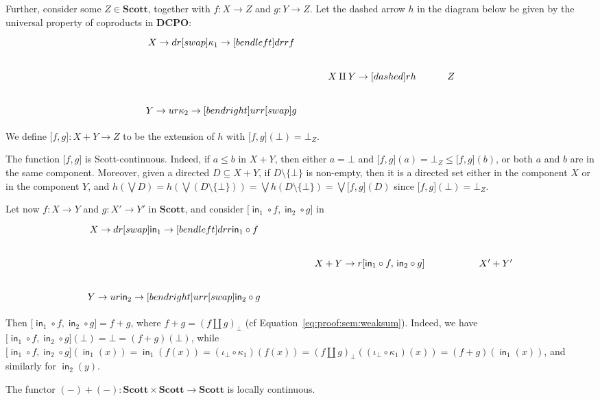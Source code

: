 \documentclass[%
  a4paper,
  UKenglish,
  cleveref,
  autoref,
  thm-restate,
  numberwithinsect,
]{lipics-v2021}
\newcommand\sle\subseteq
\newcommand\pl{\mathord{-}}	%
\newcommand\copair[1]{{\lbrack #1 \rbrack}}
\newcommand\comp{\mathbin\circ}
\newcommand\DCPO{\mathbf{DCPO}}
\newcommand\Scott{\mathbf{Scott}}
\newcommand\term[1]{\mathsf{#1}}
\newcommand\inj{\mathop{\term{in}}}
\newcommand\arrow\to
\begin{document}
Further,
consider some $Z \in \Scott$,
together with $f \colon X \to Z$
and $g \colon Y \to Z$.
Let the dashed arrow $h$ in the diagram below be given by the
universal property of coproducts in $\DCPO$:
\[
\begin{tikzcd}
  X
  \arrow{dr}[swap]{\kappa_1}
  \arrow[bend left]{drr}{f}
\\
& X \amalg Y
  \arrow[dashed]{r}{h}
& Z
\\
  Y
  \arrow{ur}{\kappa_2}
  \arrow[bend right]{urr}[swap]{g}
\end{tikzcd}
\]

\noindent
We define $\copair{f,g} \colon X+Y \to Z$
to be the extension of $h$ with $\copair{f,g}(\bot) = \bot_Z$.

The function $\copair{f,g}$ is Scott-continuous.
Indeed, if $a \leq b$ in $X+Y$,
then either $a = \bot$
and $\copair{f,g}(a) = \bot_Z \leq \copair{f,g}(b)$,
or both $a$ and $b$ are in the same component.
Moreover, given a directed $D \sle X + Y$,
if $D \setminus \{\bot\}$ is non-empty,
then it is a directed set either in the component $X$ or in the component $Y$,
and
\(
  h(\bigvee D)
  =
  h(\bigvee (D\setminus \{\bot\}))
  =
  \bigvee h(D \setminus \{\bot\})
  =
  \bigvee \copair{f,g}(D)
\)
since $\copair{f,g}(\bot) = \bot_Z$.

Let now $f \colon X \to Y$
and $g \colon X' \to Y'$ in $\Scott$,
and consider 
$\copair{{\inj_1} \comp f, {\inj_2} \comp g}$
in
\[
\begin{tikzcd}[column sep=huge]
  X
  \arrow{dr}[swap]{\inj_1}
  \arrow[bend left]{drr}{{\inj_1} \comp f}
\\
& X + Y
  \arrow{r}{\copair{{\inj_1} \comp f,\, {\inj_2} \comp g}}
& X' + Y'
\\
  Y
  \arrow{ur}{\inj_2}
  \arrow[bend right]{urr}[swap]{{\inj_2} \comp g}
\end{tikzcd}
\]

Then $\copair{{\inj_1} \comp f, {\inj_2} \comp g} = f+g$,
where $f+g = (f \amalg g)_\bot$
(cf Equation~\eqref{eq:proof:sem:weaksum}).
Indeed,
we have
$\copair{{\inj_1} \comp f, {\inj_2} \comp g}(\bot) = \bot = (f+g)(\bot)$,
while
\(
  \copair{{\inj_1} \comp f, {\inj_2} \comp g}(\inj_1(x))
  =
  \inj_1(f(x))
  =
  (\iota_\bot \comp \kappa_1)(f(x))
  =
  (f \amalg g)_\bot((\iota_\bot \comp \kappa_1) (x))
  =
  (f+g)(\inj_1(x))
\),
and similarly for $\inj_2(y)$.



\begin{lemma}
\label{lem:proof:sem:weaksum:local}
The functor $(\pl) + (\pl) \colon \Scott \times \Scott \to \Scott$
is locally continuous.
\end{lemma}
\end{document}
